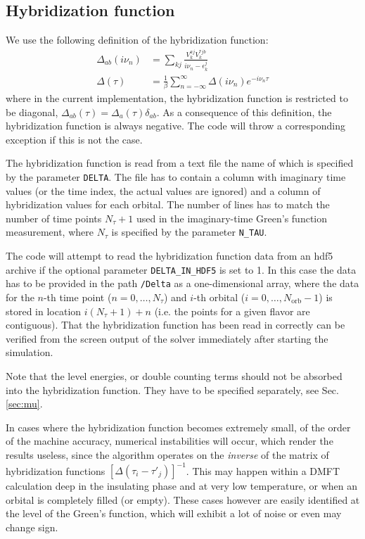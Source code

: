 \documentclass[aps,prb,floatfix,superscriptaddress,twocolumn,notitlepage]{revtex4-1}
\newcommand{\iom}{{\ensuremath{i\nu}}}
\begin{document}
\subsection{Hybridization function}
\label{hybridization}
We use the following definition of the hybridization function:
\begin{align}
\Delta_{ab}(\iom_{n}) &= \sum_{kj}\frac{V_{k}^{aj}V_{k}^{*jb}}{\iom_{n}-\epsilon_{k}^{j}}\\
\Delta(\tau) &= \frac{1}{\beta}\sum_{n=-\infty}^{\infty}\Delta(\iom_{n})e^{-\iom_{n}\tau}
\end{align}
where in the current implementation, the hybridization function is restricted to be diagonal, $\Delta_{ab}(\tau)=\Delta_{a}(\tau)\delta_{ab}$.
As a consequence of this definition, the hybridization function is always negative. The code will throw a corresponding exception if this is not the case.

The hybridization function is read from a text file the name of which is specified by the parameter \verb#DELTA#. The file has to contain a column with imaginary time values (or the time index, the actual values are ignored) and a column of hybridization values for each orbital. The number of lines has to match the number of time points $N_{\tau}+1$ used in the imaginary-time Green's function measurement, where $N_{\tau}$ is specified by the parameter \verb#N_TAU#.

The code will attempt to read the hybridization function data from an hdf5 archive if the optional parameter \verb#DELTA_IN_HDF5# is set to 1. In this case the data has to be provided in the path \verb#/Delta# as a one-dimensional array, where the data for the $n$-th time point ($n=0,\ldots,N_{\tau}$) and $i$-th orbital ($i=0,\ldots,N_{\text{orb}}-1$) is stored in location $i(N_{\tau}+1)+n$ (i.e. the points for a given flavor are contiguous).
That the hybridization function has been read in correctly can be verified from the screen output of the solver immediately after starting the simulation.

Note that the level energies, or double counting terms should not be absorbed into the hybridization function. They have to be specified separately, see Sec. \ref{sec:mu}.

In cases where the hybridization function becomes extremely small, of the order of the machine accuracy, numerical instabilities will occur, which render the results useless, since the algorithm operates on the \emph{inverse} of the matrix of hybridization functions $[\Delta(\tau_{i}-\tau'_{j})]^{-1}$.
This may happen within a DMFT calculation deep in the insulating phase and at very low temperature, or when an orbital is completely filled (or empty).
These cases however are easily identified at the level of the Green's function, which will exhibit a lot of noise or even may change sign.
\end{document}
